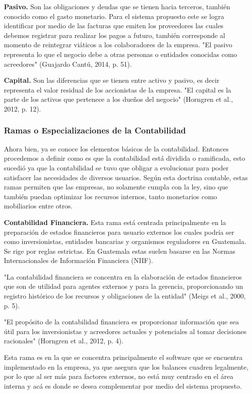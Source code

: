 \textbf{Pasivo.} Son las obligaciones y deudas que se tienen hacia terceros, también conocido como el gasto monetario. Para el sistema propuesto este se logra identificar por medio de las facturas que emiten los proveedores las cuales debemos registrar para realizar los pagos a futuro, también corresponde al momento de reintegrar viáticos a los colaboradores de la empresa. "El pasivo representa lo que el negocio debe a otras personas o entidades conocidas como acreedores" (Guajardo Cantú, 2014, p. 51).

\textbf{Capital.} Son las diferencias que se tienen entre activo y pasivo, es decir representa el valor residual de los accionistas de la empresa. "El capital es la parte de los activos que pertenece a los dueños del negocio" (Horngren et al., 2012, p. 12).

\subsubsection{Ramas o Especializaciones de la Contabilidad}

Ahora bien, ya se conoce los elementos básicos de la contabilidad. Entonces procedemos a definir como es que la contabilidad está dividida o ramificada, esto sucedió ya que la contabilidad se tuvo que obligar a evolucionar para poder satisfacer las necesidades de diversos usuarios. Según esta doctrina contable, estas ramas permiten que las empresas, no solamente cumpla con la ley, sino que también puedan optimizar los recursos internos, tanto monetarios como mobiliarios entre otros.

\textbf{Contabilidad Financiera.} Esta rama está centrada principalmente en la preparación de estados financieros para usuario externos los cuales podría ser como inversionistas, entidades bancarias y organismos reguladores en Guatemala. Se rige por reglas estrictas. En Guatemala estas suelen basarse en las Normas Internacionales de Información Financiera (NIIF).

"La contabilidad financiera se concentra en la elaboración de estados financieros que son de utilidad para agentes externos y para la gerencia, proporcionando un registro histórico de los recursos y obligaciones de la entidad" (Meigs et al., 2000, p. 5).

"El propósito de la contabilidad financiera es proporcionar información que sea útil para los inversionistas y acreedores actuales y potenciales al tomar decisiones racionales" (Horngren et al., 2012, p. 4).

Esta rama es en la que se concentra principalmente el software que se encuentra implementado en la empresa, ya que asegura que los balances cuadren legalmente, por lo que al ser más para factores externos, no está muy centrado en el área interna y acá es donde se desea complementar por medio del sistema propuesto.

